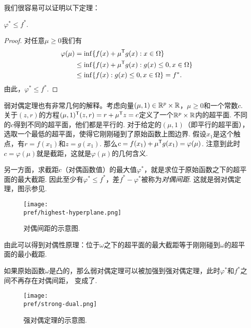 我们很容易可以证明以下定理：

\begin{theorem}[弱对偶定理]\label{thm:weak-dual}
    $\varphi^\ast\le f^\ast$.
\end{theorem}

\begin{proof}
    对任意${\mu \ge 0}$我们有
    \begin{align*}
        \varphi({\mu}) &=\inf\{f({x})+{\mu^{\mathsf{T}} g(x):x}\in\Omega\} \\
        & \le \inf\{f({x})+{\mu^{\mathsf{T}} g(x):g(x)\le 0,x}\in\Omega\} \\
        & \le \inf\{f({x}):{g(x)\le 0, x}\in\Omega\}=f^\ast.
    \end{align*}
    由此，$\varphi^\ast\le f^\ast$. 
\end{proof}

弱对偶定理也有非常几何的解释。考虑向量$(\mu,1)\in \mathbb{R}^{p}\times\mathbb{R}$，${\mu}\ge{0}$和一个常数$c$. 关于$(z,r)$的方程$({\mu},1)^{\mathsf{T}} (z,r)=r+{\mu^{\mathsf{T}} z}=c$定义了一个$\mathbb{R}^{p}\times\mathbb{R}$内的超平面. 不同的$c$得到不同的超平面，他们都是平行的. 对于给定的$({\mu},1)$（即平行的超平面），选取一个最低的超平面，使得它刚刚碰到了原始函数上图边界. 假设${x_1}$是这个触点，有$r=f(x_1)$和$z=g(x_1)$. 那么$c=f({x_1})+{\mu^{\mathsf{T}} g(x_1)}=\varphi({\mu})$. 注意到此时$c=\varphi({\mu})$就是截距，这就是$\varphi(\mu)$的几何含义.

另一方面，求截距$c$（对偶函数值）的最大值$\varphi^*$，就是求位于原始函数之下的超平面的最大截距. 因此至少有$\varphi^*\leq f^*$，差$f^*-\varphi^*$被称为\emph{对偶间距}. 这就是弱对偶定理，图示参见.

\begin{figure}
    \centering
    \texttt{[image: \\pref/highest-hyperplane.png]}
    \caption{对偶间距的示意图.}
    \label{fig:highest-hyperplane}
\end{figure}

由此可以得到对偶性原理：位于$\omega$之下的超平面的最大截距等于刚刚碰到$\omega$的超平面的最小截距.

如果原始函数$\omega$是凸的，那么弱对偶定理可以被加强到强对偶定理，此时$\varphi^*$和$f^\ast$之间不再存在对偶间距， 变成了.

\begin{figure}
    \centering
    \texttt{[image: \\pref/strong-dual.png]}
    \caption{强对偶定理的示意图.}
    \label{fig:strong-dual}
\end{figure}

